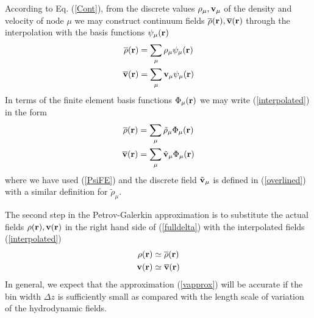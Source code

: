 \documentclass[b5paper,openright,11pt]{book}
\begin{document}
According  to Eq.  (\ref{Cont}), from  the discrete  values $\rho_\mu,
{\bf  v}_\mu$  of the  density  and  velocity  of  node $\mu$  we  may
construct  continuum  fields  $\overline{\rho}({\bf  r}),\overline{\bf
  v}({\bf  r})$ through  the  interpolation with  the basis  functions
$\psi_\mu({\bf r})$
\begin{align}
\overline{\rho}({\bf r})&=\sum_\mu{\rho}_\mu\psi_\mu({\bf r})
\nonumber\\
\overline{\bf  v}({\bf r})&=\sum_\mu{\bf v}_\mu \psi_\mu({\bf r})
\label{interpolated}
\end{align}
In terms of  the finite element basis functions $\Phi_\mu({\bf r})$ we may write
(\ref{interpolated})  in the form 
\begin{align}
\overline{\rho}({\bf r})&=\sum_\mu\tilde{\rho}_\mu\Phi_\mu({\bf r})
\nonumber\\
\overline{\bf  v}({\bf r})&= \sum_\mu\tilde{\bf v}_\mu\Phi_\mu({\bf r})
\label{interpolated2}
\end{align}
where  we  have  used  (\ref{PsiFE})   and  the   discrete  field
$\tilde{\bf  v}_\mu$ is  defined in  (\ref{overlined}) with  a similar
definition for $\tilde{\rho}_\mu$.

The second step in the  Petrov-Galerkin approximation is to substitute
the actual fields $\rho({\bf r}), {\bf  v}({\bf r})$ in the right hand
side    of   (\ref{fulldelta})    with    the   interpolated    fields
(\ref{interpolated})
\begin{align}
 {\rho}({\bf r})&\simeq \overline{\rho}({\bf r})
\nonumber\\
 {\bf v}({\bf r})&\simeq \overline{\bf v}({\bf r})
\label{vapprox}
\end{align}
In general, we  expect that the approximation  (\ref{vapprox}) will be
accurate if the bin width $\Delta z$ is sufficiently small as compared
with  the  length  scale  of variation  of  the  hydrodynamic  fields.
\end{document}
